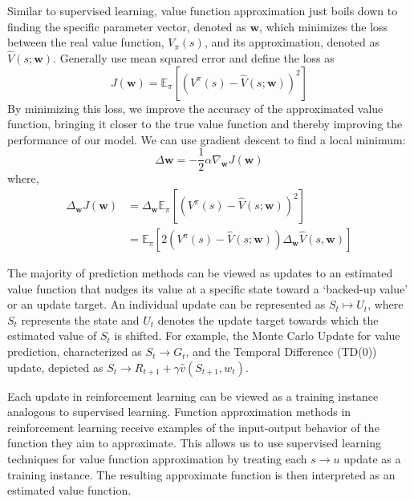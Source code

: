 Similar to supervised learning, value function approximation just boils down to finding the specific parameter vector, denoted as $\mathbf{w}$, which minimizes the loss between the real value function, $V_\pi(s)$, and its approximation, denoted as $\hat{V}(s; \boldsymbol{w})$. Generally use mean squared error and define the loss as
$$
J(\mathbf{w}) = \mathbb{E}_\pi[(V^\pi(s) - \hat{V}(s;  \mathbf{w}))^2]
$$
By minimizing this loss, we improve the accuracy of the approximated value function, bringing it closer to the true value function and thereby improving the performance of our model. We can  use gradient descent to find a local minimum:
$$
\Delta\mathbf{w} = -\frac{1}{2}\alpha \nabla_{\mathbf{w}} J(\mathbf{w})
$$
where,
\begin{align*}
\Delta_\mathbf{w} J(\mathbf{w}) &= \Delta_\mathbf{w} \mathbb{E}_\pi[(V^\pi(s) - \hat{V}(s;\mathbf{w}))^2] \\
&= \mathbb{E}_\pi[2(V^\pi(s) - \hat{V}(s;\mathbf{w})) \Delta_\mathbf{w} \hat{V}(s, \mathbf{w})]
\end{align*}


The majority of prediction methods can be viewed as updates to an estimated value function that nudges its value at a specific state toward a `backed-up value' or an update target. An individual update can be represented as $S_t \mapsto U_t$, where $S_t$ represents the state and $U_t$ denotes the update target towards which the estimated value of $S_t$ is shifted. For example, the Monte Carlo Update for value prediction, characterized as $S_t \to G_t$, and the Temporal Difference (TD(0)) update, depicted as $S_t \to R_{t+1} + \gamma \hat{v}(S_{t+1},w_{t})$.


Each update in reinforcement learning can be viewed as a training instance analogous to supervised learning. Function approximation methods in reinforcement learning receive examples of the input-output behavior of the function they aim to approximate. This allows us to use supervised learning techniques for value function approximation by treating each $s \to u$ update as a training instance. The resulting approximate function is then interpreted as an estimated value function.

